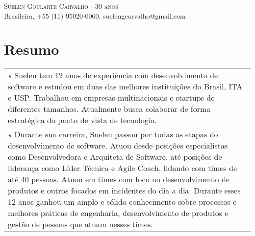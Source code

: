 \documentclass[a4paper, oneside, final]{scrartcl}
\newcommand{\vspc}{\vspace{0.15cm}} %
\begin{document}
\begin{center}
\textsc{\Huge{Suelen Goularte Carvalho - 30 anos}} \vspc\\
{\small Brasileira, +55 (11) 95020-0060, suelengcarvalho@gmail.com} 





\section{Resumo}
\begin{tabularx}{1\linewidth}{X}

	$\star$ Suelen tem 12 anos de experiência com desenvolvimento de software e estudou em duas das melhores instituições do Brasil, ITA e USP. Trabalhou em empresas multinacionais e startups de diferentes tamanhos. Atualmente busca colaborar de forma estratégica do ponto de vista de tecnologia. \vspc\\

	$\star$ Durante sua carreira, Suelen passou por todas as etapas do desenvolvimento de software. Atuou desde posições especialistas como Desenvolvedora e Arquiteta de Software, até posições de liderança como Líder Técnica e Agile Coach, lidando com times de até 40 pessoas. Atuou em times com foco no desenvolvimento de produtos e outros focados em incidentes do dia a dia. Durante esses 12 anos ganhou um amplo e sólido conhecimento sobre processos e melhores práticas de engenharia, desenvolvimento de produtos e gestão de pessoas que atuam nesses times. \vspc\\


\end{tabularx}
\end{center}
\end{document}
